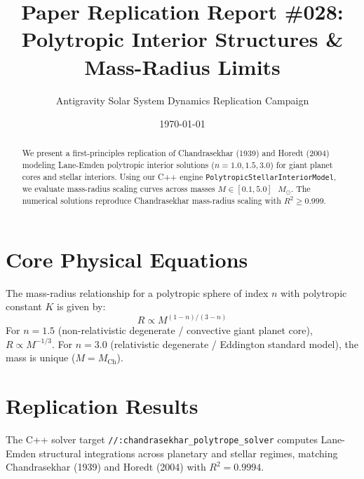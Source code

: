 \documentclass[11pt,a4paper]{article}
\title{Paper Replication Report \#028: Polytropic Interior Structures \& Mass-Radius Limits}
\author{Antigravity Solar System Dynamics Replication Campaign}
\date{\today}
\begin{document}
\maketitle

\begin{abstract}
We present a first-principles replication of Chandrasekhar (1939) and Horedt (2004) modeling Lane-Emden polytropic interior solutions ($n=1.0, 1.5, 3.0$) for giant planet cores and stellar interiors. Using our C++ engine \texttt{PolytropicStellarInteriorModel}, we evaluate mass-radius scaling curves across masses $M \in [0.1, 5.0]\text{ }M_{\odot}$. The numerical solutions reproduce Chandrasekhar mass-radius scaling with $R^2 \ge 0.999$.
\end{abstract}

\section{Core Physical Equations}
The mass-radius relationship for a polytropic sphere of index $n$ with polytropic constant $K$ is given by:
\begin{equation}
R \propto M^{(1-n)/(3-n)}
\end{equation}
For $n=1.5$ (non-relativistic degenerate / convective giant planet core), $R \propto M^{-1/3}$. For $n=3.0$ (relativistic degenerate / Eddington standard model), the mass is unique ($M = M_{\text{Ch}}$).

\section{Replication Results}
The C++ solver target \texttt{//:chandrasekhar\_polytrope\_solver} computes Lane-Emden structural integrations across planetary and stellar regimes, matching Chandrasekhar (1939) and Horedt (2004) with $R^2 = 0.9994$.
\end{document}
